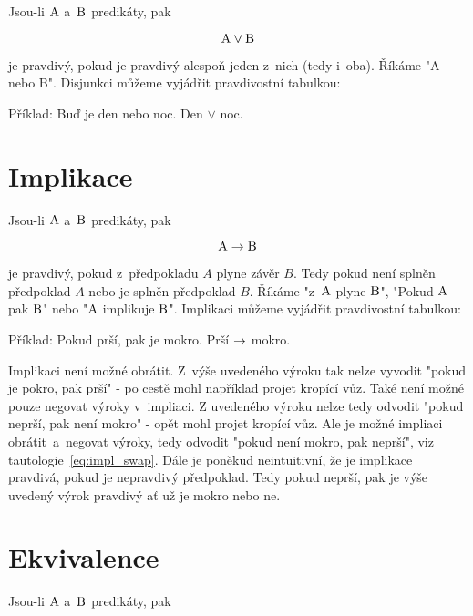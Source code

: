Jsou-li \(\mathrm{A}\) a~\(\mathrm{B}\) predikáty, pak

\begin{equation}
\mathrm{A} \lor \mathrm{B}
\end{equation}

je pravdivý, pokud je pravdivý alespoň jeden z~nich (tedy i~oba). Říkáme "\(\mathrm{A}\) nebo \(\mathrm{B}\)".
Disjunkci můžeme vyjádřit pravdivostní tabulkou:


Příklad: Buď je den nebo noc. Den \(\lor\) noc.

\section{Implikace}

Jsou-li \(\mathrm{A}\) a~\(\mathrm{B}\) predikáty, pak

\begin{equation}
\mathrm{A} \rightarrow \mathrm{B}
\end{equation}

je pravdivý, pokud z~předpokladu \(A\) plyne závěr \(B\). Tedy pokud není splněn předpoklad \(A\) nebo je splněn předpoklad \(B\). Říkáme "z~\(\mathrm{A}\) plyne \(\mathrm{B}\)", "Pokud \(\mathrm{A}\) pak \(\mathrm{B}\)" nebo "\(\mathrm{A}\) implikuje \(\mathrm{B}\)".
Implikaci můžeme vyjádřit pravdivostní tabulkou:


Příklad: Pokud prší, pak je mokro. Prší \(\rightarrow\) mokro.

Implikaci není možné obrátit. Z~výše uvedeného výroku tak nelze vyvodit "pokud je pokro, pak prší" - po cestě mohl například projet kropící vůz. Také není možné pouze negovat výroky v~impliaci. Z uvedeného výroku nelze tedy odvodit "pokud neprší, pak není mokro" - opět mohl projet kropící vůz. Ale je možné impliaci obrátit~a~negovat výroky, tedy odvodit "pokud není mokro, pak neprší", viz tautologie~\eqref{eq:impl_swap}. Dále je poněkud neintuitivní, že je implikace pravdivá, pokud je nepravdivý předpoklad. Tedy pokud neprší, pak je výše uvedený výrok pravdivý ať už je mokro nebo ne. 

\section{Ekvivalence}

Jsou-li \(\mathrm{A}\) a~\(\mathrm{B}\) predikáty, pak

